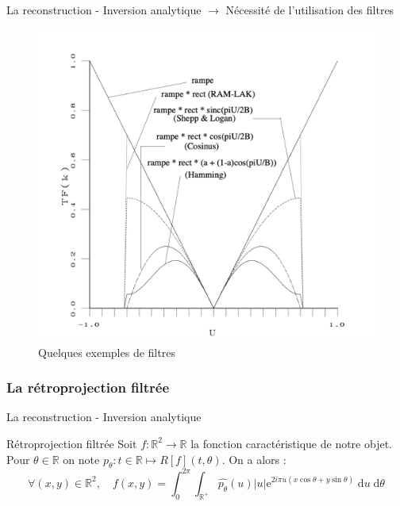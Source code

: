 \documentclass{beamer}
\newcommand*{\R}{\mathbb{R}}
\newcommand*{\dd}[1]{\mathrm{d}#1}
\begin{document}
\begin{frame}{La reconstruction - Inversion analytique}
    $\rightarrow$ Nécessité de l'utilisation des filtres
    \begin{figure}[h]
        \centering
        \includegraphics[scale = 0.3]{filtres.png}
        \caption{Quelques exemples de filtres}
    \end{figure}
\end{frame}

\subsubsection{La rétroprojection filtrée}
\begin{frame}{La reconstruction - Inversion analytique}
    \begin{beamerboxesrounded}{Rétroprojection filtrée}
        Soit $f : \R^2 \longrightarrow \R$ la fonction caractéristique de notre objet. Pour $\theta \in \R$ on note $p_{\theta} : t \in \R \longmapsto R[f](t,\theta)$. On a alors : 
        $$\forall (x,y) \in \R^2, \quad f(x,y) = \int_{0}^{2\pi}\int_{\R^+} \widehat{p_{\theta}}(u) \lvert u \rvert \mathrm{e}^{2i \pi u (x \cos \theta + y \sin \theta)} \; \dd u \; \dd \theta$$
    \end{beamerboxesrounded}
\end{frame}
\end{document}
